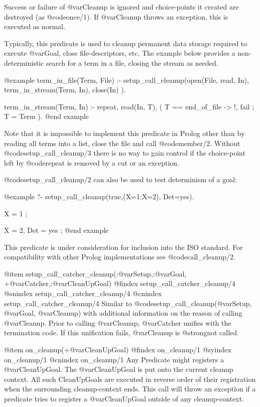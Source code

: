 {{{{{{{{{Success or failure of @var{Cleanup} is ignored and choice-points it
created are destroyed (as @code{once/1}). If @var{Cleanup} throws an exception,
this is executed as normal.

Typically, this predicate is used to cleanup permanent data storage
required to execute @var{Goal}, close file-descriptors, etc. The example
below provides a non-deterministic search for a term in a file, closing
the stream as needed.

@example
term_in_file(Term, File) :-
	setup_call_cleanup(open(File, read, In),
			   term_in_stream(Term, In),
			   close(In) ).

term_in_stream(Term, In) :-
	repeat,
	read(In, T),
	(   T == end_of_file
	->  !, fail
	;   T = Term
	).
@end example

Note that it is impossible to implement this predicate in Prolog other than
by reading all terms into a list, close the file and call @code{member/2}.
Without @code{setup_call_cleanup/3} there is no way to gain control if the
choice-point left by @code{repeat} is removed by a cut or an exception.

@code{setup_call_cleanup/2} can also be used to test determinism of a goal:

@example
?- setup_call_cleanup(true,(X=1;X=2), Det=yes).

X = 1 ;

X = 2,
Det = yes ;
@end example

This predicate is under consideration for inclusion into the ISO standard.
For compatibility with other Prolog implementations see @code{call_cleanup/2}.

 @item setup_call_catcher_cleanup(:@var{Setup},:@var{Goal}, +@var{Catcher},:@var{CleanUpGoal})
@findex setup_call_catcher_cleanup/4
@snindex setup_call_catcher_cleanup/4
@cnindex setup_call_catcher_cleanup/4
Similar to @code{setup_call_cleanup(@var{Setup}, @var{Goal}, @var{Cleanup})} with
additional information on the reason of calling @var{Cleanup}.  Prior
to calling @var{Cleanup}, @var{Catcher} unifies with the termination
code.  If this unification fails, @var{Cleanup} is
@strong{not} called.


@item on_cleanup(+@var{CleanUpGoal})
@findex on_cleanup/1
@syindex on_cleanup/1
@cnindex on_cleanup/1
Any Predicate might registers a @var{CleanUpGoal}. The
@var{CleanUpGoal} is put onto the current cleanup context. All such
CleanUpGoals are executed in reverse order of their registration when
the surrounding cleanup-context ends. This call will throw an exception
if a predicate tries to register a @var{CleanUpGoal} outside of any
cleanup-context.

}}}}}}}}}
